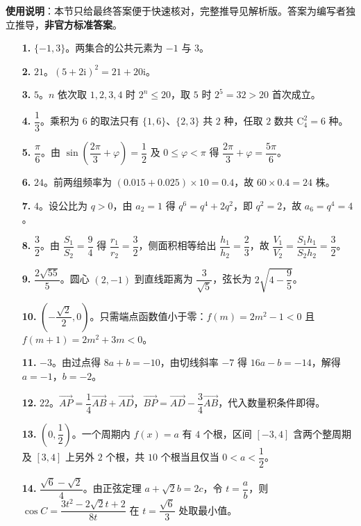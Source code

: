 
\begin{gknotice}
\textbf{使用说明}：本节只给最终答案便于快速核对，完整推导见解析版。答案为编写者独立推导，\textbf{非官方标准答案}。
\end{gknotice}

\begin{itemize}[leftmargin=2.6em]
  \item[\textbf{1.}] $\{-1,3\}$。两集合的公共元素为 $-1$ 与 $3$。
  \item[\textbf{2.}] $21$。$(5+2\mathrm i)^2=21+20\mathrm i$。
  \item[\textbf{3.}] $5$。$n$ 依次取 $1,2,3,4$ 时 $2^n\leqslant 20$，取 $5$ 时 $2^5=32>20$ 首次成立。
  \item[\textbf{4.}] $\dfrac13$。乘积为 $6$ 的取法只有 $\{1,6\}$、$\{2,3\}$ 共 $2$ 种，任取 $2$ 数共 $\mathrm C_4^2=6$ 种。
  \item[\textbf{5.}] $\dfrac\pi6$。由 $\sin\left(\dfrac{2\pi}3+\varphi\right)=\dfrac12$ 及 $0\leqslant\varphi<\pi$ 得 $\dfrac{2\pi}3+\varphi=\dfrac{5\pi}6$。
  \item[\textbf{6.}] $24$。前两组频率为 $(0.015+0.025)\times10=0.4$，故 $60\times0.4=24$ 株。
  \item[\textbf{7.}] $4$。设公比为 $q>0$，由 $a_2=1$ 得 $q^6=q^4+2q^2$，即 $q^2=2$，故 $a_6=q^4=4$。
  \item[\textbf{8.}] $\dfrac32$。由 $\dfrac{S_1}{S_2}=\dfrac94$ 得 $\dfrac{r_1}{r_2}=\dfrac32$，侧面积相等给出 $\dfrac{h_1}{h_2}=\dfrac23$，故 $\dfrac{V_1}{V_2}=\dfrac{S_1h_1}{S_2h_2}=\dfrac32$。
  \item[\textbf{9.}] $\dfrac{2\sqrt{55}}5$。圆心 $(2,-1)$ 到直线距离为 $\dfrac{3}{\sqrt5}$，弦长为 $2\sqrt{4-\dfrac95}$。
  \item[\textbf{10.}] $\left(-\dfrac{\sqrt2}2,0\right)$。只需端点函数值小于零：$f(m)=2m^2-1<0$ 且 $f(m+1)=2m^2+3m<0$。
  \item[\textbf{11.}] $-3$。由过点得 $8a+b=-10$，由切线斜率 $-7$ 得 $16a-b=-14$，解得 $a=-1$，$b=-2$。
  \item[\textbf{12.}] $22$。$\overrightarrow{AP}=\dfrac14\overrightarrow{AB}+\overrightarrow{AD}$，$\overrightarrow{BP}=\overrightarrow{AD}-\dfrac34\overrightarrow{AB}$，代入数量积条件即得。
  \item[\textbf{13.}] $\left(0,\dfrac12\right)$。一个周期内 $f(x)=a$ 有 $4$ 个根，区间 $[-3,4]$ 含两个整周期及 $[3,4]$ 上另外 $2$ 个根，共 $10$ 个根当且仅当 $0<a<\dfrac12$。
  \item[\textbf{14.}] $\dfrac{\sqrt6-\sqrt2}4$。由正弦定理 $a+\sqrt2b=2c$，令 $t=\dfrac ab$，则 $\cos C=\dfrac{3t^2-2\sqrt2t+2}{8t}$ 在 $t=\dfrac{\sqrt6}3$ 处取最小值。
\end{itemize}


